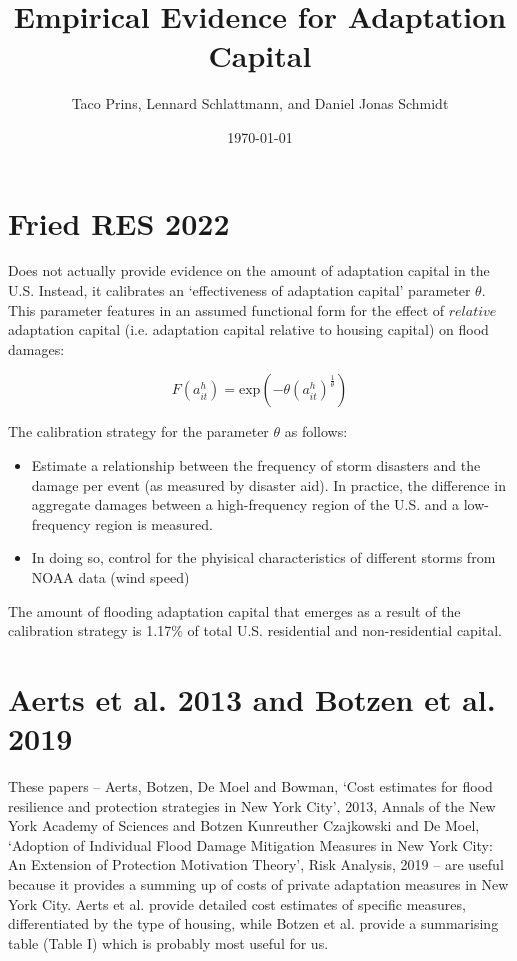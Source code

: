 \documentclass[12pt]{article}
\title{Empirical Evidence for Adaptation Capital}
\author{Taco Prins, Lennard Schlattmann, and Daniel Jonas Schmidt}
\date{\today}
\begin{document}
\maketitle

\section*{Fried RES 2022}
Does not actually provide evidence on the amount of adaptation capital in the U.S. Instead, it calibrates an `effectiveness of adaptation capital' parameter $\theta$. This parameter features in an assumed functional form for the effect of $\textit{relative}$ adaptation capital (i.e. adaptation capital relative to housing capital) on flood damages:

\begin{equation}
F(a_{it}^h)=\text{exp}(-\theta(a_{it}^h)^{\frac{1}{\theta}})
\end{equation}

The calibration strategy for the parameter $\theta$ as follows:

\begin{itemize}
\item Estimate a relationship between the frequency of storm disasters and the damage per event (as measured by disaster aid). In practice, the difference in aggregate damages between a high-frequency region of the U.S. and a low-frequency region is measured.
\item In doing so, control for the phyisical characteristics of different storms from NOAA data (wind speed)
\end{itemize}

The amount of flooding adaptation capital that emerges as a result of the calibration strategy is 1.17$\%$ of total U.S. residential and non-residential capital.

\section*{Aerts et al. 2013 and Botzen et al. 2019}

These papers -- Aerts, Botzen, De Moel and Bowman, `Cost estimates for flood resilience and protection strategies in New York City', 2013, Annals of the New York Academy of Sciences and Botzen Kunreuther Czajkowski and De Moel, `Adoption of Individual Flood Damage Mitigation Measures
in New York City: An Extension of Protection
Motivation Theory', Risk Analysis, 2019 -- are useful because it provides a summing up of costs of private adaptation measures in New York City. Aerts et al. provide detailed cost estimates of specific measures, differentiated by the type of housing, while Botzen et al. provide a summarising table (Table I) which is probably most useful for us. 
\end{document}
